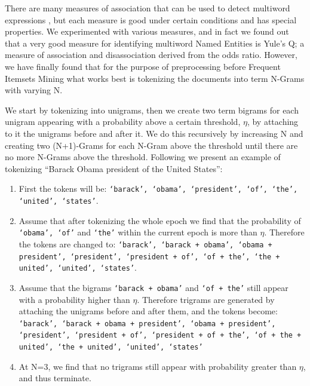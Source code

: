 \documentclass{sig-alternate}
\begin{document}
There are many measures of association that can be used to detect multiword expressions \cite{afzal}, but each measure is good under certain conditions and has special properties. We experimented with various measures, and in fact we found out that a very good measure for identifying multiword Named Entities is Yule's Q; a measure of association and disassociation derived from the odds ratio. However, we have finally found that for the purpose of preprocessing before Frequent Itemsets Mining what works best is tokenizing the documents into term N-Grams with varying N. 

We start by tokenizing into unigrams, then we
create two term bigrams for each unigram appearing with a probability above a certain threshold, $\eta$, by attaching to it the unigrams before and after it. We do this recursively by increasing N and creating two (N+1)-Grams for each N-Gram above the threshold until there are no more N-Grams above the threshold. 
Following we present an example of tokenizing ``Barack Obama president of the United States'':

\begin{enumerate}
\item First the tokens will be: \texttt{`barack', `obama', `president', `of', `the', `united', `states'}. 
\item Assume that after tokenizing the whole epoch we find that the probability of \texttt{`obama', `of'} and \texttt{`the'} within the current epoch is more than $\eta$. Therefore the tokens are changed to: \texttt{`barack',  `barack + obama', `obama + president', `president', `president + \\of', `of + the', `the + united', `united', `states'}.
\item Assume that the bigrams  \texttt{`barack + obama'} and \texttt{`of + the'} still appear with a probability higher than %
$\eta$. Therefore trigrams are generated by attaching the unigrams before and after them, and the tokens become: \texttt{`barack',  `barack + obama + president', `obama + president', `president', `president + of', `president + of + the', `of + the + united', `the + \\united', `united', `states'}
\item At N=3, we find that no trigrams still appear with probability greater than $\eta$, and thus terminate.
\end{enumerate}
\end{document}

